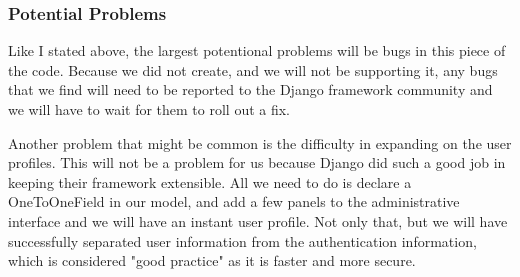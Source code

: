 \subsubsection{Potential Problems}

Like I stated above, the largest potentional problems will be bugs in this piece of the code. Because we did not create, and we will not be supporting it, any bugs that we find will need to be reported to the Django framework community and we will have to wait for them to roll out a fix.

Another problem that might be common is the difficulty in expanding on the user profiles. This will not be a problem for us because Django did such a good job in keeping their framework extensible. All we need to do is declare a OneToOneField in our model, and add a few panels to the administrative interface and we will have an instant user profile. Not only that, but we will have successfully separated user information from the authentication information, which is considered "good practice" as it is faster and more secure.